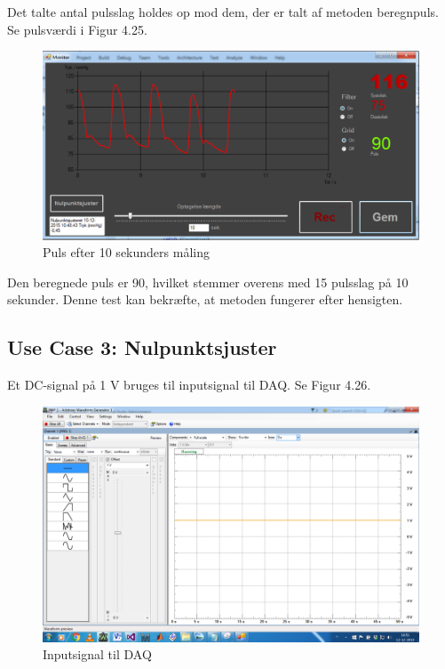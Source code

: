 Det talte antal pulsslag holdes op mod dem, der er talt af metoden beregnpuls. Se pulsværdi i Figur 4.25.

\begin{figure}[H]
	\centering
	\includegraphics[width=1\textwidth]{Figurer/Pulstest_monitor}
	\caption{Puls efter 10 sekunders måling}
\end{figure}


Den beregnede puls er 90, hvilket stemmer overens med 15 pulsslag på 10 sekunder. Denne test kan bekræfte, at metoden fungerer efter hensigten.





\subsection{Use Case 3: Nulpunktsjuster}

Et DC-signal på 1 V bruges til inputsignal til DAQ. Se Figur 4.26.
\begin{figure}[H]
	\centering
	\includegraphics[width=1\textwidth]{Figurer/Test_Nul_1}
	\caption{Inputsignal til DAQ}
\end{figure}

